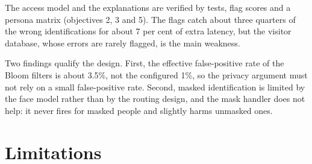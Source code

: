 \documentclass[12pt,a4paper,oneside]{report}
\begin{document}
The access model and the explanations are verified by tests, flag scores and a persona matrix (objectives 2, 3 and 5). The flags catch about three quarters of the wrong identifications for about 7 per cent of extra latency, but the visitor database, whose errors are rarely flagged, is the main weakness.

Two findings qualify the design. First, the effective false-positive rate of the Bloom filters is about 3.5\%, not the configured 1\%, so the privacy argument must not rely on a small false-positive rate. Second, masked identification is limited by the face model rather than by the routing design, and the mask handler does not help: it never fires for masked people and slightly harms unmasked ones.

\section{Limitations}
\end{document}

